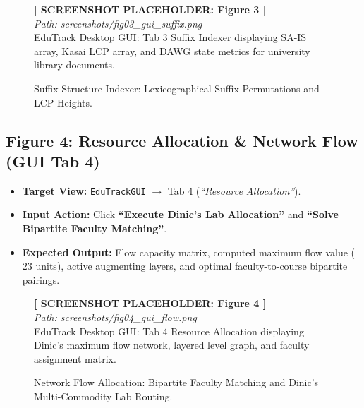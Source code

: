 \begin{figure}[H]
\centering
\begin{tcolorbox}[colback=white,colframe=codegray,width=0.92\textwidth,halign=center]
\vspace{0.8cm}
\textbf{[ SCREENSHOT PLACEHOLDER: Figure 3 ]}\\
\textit{Path: screenshots/fig03_gui_suffix.png}\\
\small EduTrack Desktop GUI: Tab 3 Suffix Indexer displaying SA-IS array, Kasai LCP array, and DAWG state metrics for university library documents.
\vspace{0.8cm}
\end{tcolorbox}
\caption{Suffix Structure Indexer: Lexicographical Suffix Permutations and LCP Heights.}
\label{fig:ss_suffix}
\end{figure}

\subsection{Figure 4: Resource Allocation \& Network Flow (GUI Tab 4)}
\begin{itemize}
    \item \textbf{Target View:} \texttt{EduTrackGUI} $\to$ Tab 4 (\textit{``Resource Allocation''}).
    \item \textbf{Input Action:} Click \textbf{``Execute Dinic's Lab Allocation''} and \textbf{``Solve Bipartite Faculty Matching''}.
    \item \textbf{Expected Output:} Flow capacity matrix, computed maximum flow value ($23$ units), active augmenting layers, and optimal faculty-to-course bipartite pairings.
\end{itemize}

\begin{figure}[H]
\centering
\begin{tcolorbox}[colback=white,colframe=codegray,width=0.92\textwidth,halign=center]
\vspace{0.8cm}
\textbf{[ SCREENSHOT PLACEHOLDER: Figure 4 ]}\\
\textit{Path: screenshots/fig04_gui_flow.png}\\
\small EduTrack Desktop GUI: Tab 4 Resource Allocation displaying Dinic's maximum flow network, layered level graph, and faculty assignment matrix.
\vspace{0.8cm}
\end{tcolorbox}
\caption{Network Flow Allocation: Bipartite Faculty Matching and Dinic's Multi-Commodity Lab Routing.}
\label{fig:ss_flow}
\end{figure}

